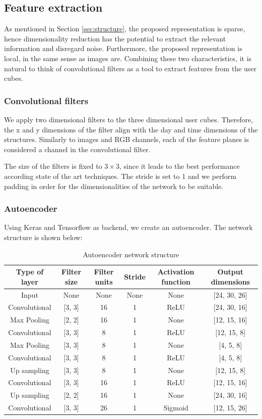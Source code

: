 \documentclass{article}
\begin{document}
\subsection{Feature extraction}
As mentioned in Section \ref{sec:structure}, the proposed representation is sparse, hence dimensionality reduction has the potential to extract the relevant information and disregard noise. Furthermore, the proposed representation is local, in the same sense as images are. Combining these two characteristics, it is natural to think of convolutional filters as a tool to extract features from the user cubes. 

\subsubsection{Convolutional filters}
We apply two dimensional filters to the three dimensional user cubes. Therefore, the x and y dimensions of the filter align with the day and time dimensions of the structures. Similarly to images and RGB channels, each of the feature planes is considered a channel in the convolutional filter. 

The size of the filters is fixed to $3 \times 3$, since it leads to the best performance according state of the art techniques. The stride is set to 1 and we perform padding in order for the dimensionalities of the network to be suitable.

\subsubsection{Autoencoder}
Using Keras and Tensorflow as backend, we create an autoencoder. The network structure is shown below:

\begin{table}[H]
\centering
\begin{tabular}{||c|c|c|c|c|c||}
\hline
\textbf{Type of layer} & \textbf{Filter size} & \textbf{Filter units} & \textbf{Stride} & \textbf{Activation function} & \textbf{Output dimensions} \\
[0.5ex] 
\hline \hline
Input & None & None & None & None  & [24, 30, 26]\\
Convolutional & [3, 3] & 16 & 1 & ReLU  & [24, 30, 16]\\
Max Pooling & [2, 2] & 16 & 1 & None  & [12, 15, 16]\\
Convolutional & [3, 3] & 8 & 1 & ReLU  & [12, 15, 8]\\
Max Pooling & [3, 3] & 8 & 1 & None  & [4, 5, 8]\\
\hline
Convolutional & [3, 3] & 8 & 1 & ReLU  & [4, 5, 8]\\
Up sampling & [3, 3] & 8 & 1 & None  & [12, 15, 8]\\
Convolutional & [3, 3] & 16 & 1 & ReLU  & [12, 15, 16]\\
Up sampling & [2, 2] & 16 & 1 & None  & [24, 30, 16]\\
Convolutional & [3, 3] & 26 & 1 & Sigmoid  & [12, 15, 26]\\ [1ex]
\hline 
\end{tabular}
\caption{Autoencoder network structure}
\label{table:autoencoderStructure}
\end{table}
\end{document}
